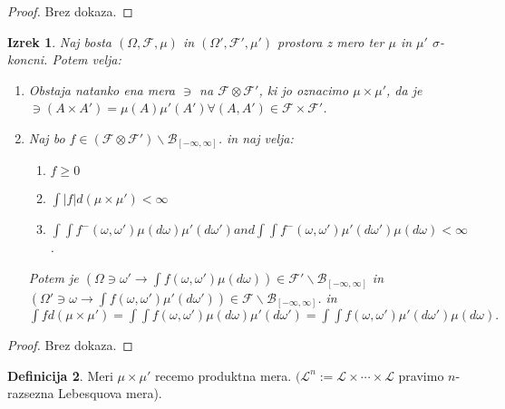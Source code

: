 \documentclass[a4paper,12pt]{article}
\theoremstyle{definition} %
\newtheorem{definicija}{Definicija}[section]
\theoremstyle{plain} %
\newtheorem{izrek}[definicija]{Izrek}
\newcommand{\F}{\mathcal{F}}
\begin{document}
            \begin{proof}
                Brez dokaza.
            \end{proof}

            \begin{izrek}
                Naj bosta $(\Omega, \F, \mu)$ in $(\Omega', \F', \mu')$ prostora z mero ter $\mu$ in $\mu'$ $\sigma$-koncni. Potem velja:
                \begin{enumerate}
                    \item Obstaja natanko ena mera $\ni$ na $\F \otimes \F'$, ki jo oznacimo $\mu \times \mu'$, da je $\ni(A \times A') = \mu(A)\mu'(A') \forall (A, A') \in \F \times \F'$.
                    \item Naj bo $f \in (\F \otimes \F')\backslash\mathcal{B}_{[-\infty, \infty]}$. in naj velja:
                        \begin{enumerate}
                            \item $ f \geq 0$
                            \item $\int|f|d(\mu \times \mu') < \infty$
                            \item $\int\int f^-(\omega, \omega')\mu(d\omega)\mu'(d\omega') and \int\int f^-(\omega, \omega')\mu'(d\omega')\mu(d\omega) < \infty$.
                        \end{enumerate}
                        Potem je $(\Omega \ni \omega' \rightarrow \int f(\omega, \omega')\mu(d\omega)) \in \F'\backslash\mathcal{B}_{[-\infty, \infty]}$ in 
                        $(\Omega' \ni \omega \rightarrow \int f(\omega, \omega')\mu'(d\omega')) \in \F\backslash\mathcal{B}_{[-\infty, \infty]}$. in 
                        $ \int fd(\mu\times\mu') = \int\int f(\omega, \omega')\mu(d\omega)\mu'(d\omega') = \int\int f(\omega, \omega')\mu'(d\omega')\mu(d\omega).$
                \end{enumerate}
            \end{izrek}

            \begin{proof}
                Brez dokaza.
            \end{proof}

            \begin{definicija}
                Meri $\mu \times \mu'$ recemo produktna mera. $(\mathcal{L}^n:= \mathcal{L}\times \cdots \times\mathcal{L}$ 
                pravimo $n$-razsezna Lebesquova mera). 
            \end{definicija}




            
\end{document}

